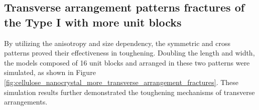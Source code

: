 \documentclass{article}
\begin{document}
\clearpage

\subsection*{Transverse arrangement patterns fractures of the Type I with more unit blocks}\indent
{}\indent

By utilizing the anisotropy and size dependency, the symmetric and cross patterns proved their effectiveness in toughening.
Doubling the length and width, the models composed of 16 unit blocks and arranged in these two patterns were simulated, as shown in Figure \ref{fig:cellulose_nanocrystal_more_transverse_arrangement_fractures}.
These simulation results further demonstrated the toughening mechanisms of transverse arrangements.
\end{document}
